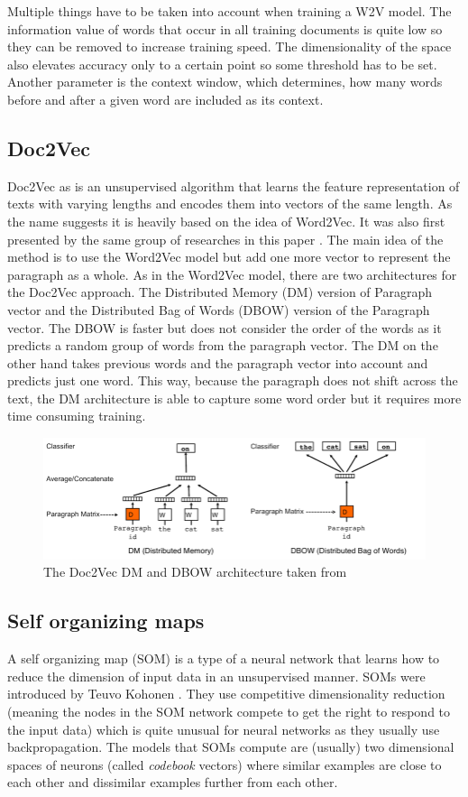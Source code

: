 Multiple things have to be taken into account when training a W2V model. The information value of words that occur in all training documents is quite low so they can be removed to increase training speed. The dimensionality of the space also elevates accuracy only to a certain point so some threshold has to be set. Another parameter is the context window, which determines, how many words before and after a given word are included as its context.

\subsection{Doc2Vec}
Doc2Vec as is an unsupervised algorithm that learns the feature representation of texts with varying lengths and encodes them into vectors of the same length. As the name suggests it is heavily based on the idea of Word2Vec. It was also first presented by the same group of researches in this paper \cite{DBLP:journals/corr/LeM14}. The main idea of the method is to use the Word2Vec model but add one more vector to represent the paragraph as a whole. As in the Word2Vec model, there are two architectures for the Doc2Vec approach. The Distributed Memory (DM) version of Paragraph vector and the Distributed Bag of Words (DBOW) version of the Paragraph vector. The DBOW is faster but does not consider the order of the words as it predicts a random group of words from the paragraph vector. The DM on the other hand takes previous words and the paragraph vector into account and predicts just one word. This way, because the paragraph does not shift across the text, the DM architecture is able to capture some word order but it requires more time consuming training.
\begin{figure}[h]
    \centering
	\includegraphics[width=140mm]{./img/DV_DBOW_doc2vec_architectures.png}
	\caption{The Doc2Vec DM and DBOW architecture taken from \cite{DBLP:journals/corr/LeM14}}
	\label{fig:dbow_dm_d2v_architecture}
\end{figure}
\subsection{Self organizing maps}
A self organizing map (SOM) is a type of a neural network that learns how to reduce the dimension of input data in an unsupervised manner. SOMs were introduced by Teuvo Kohonen \cite{Kohonen1982}. They use competitive dimensionality reduction (meaning the nodes in the SOM network compete to get the right to respond to the input data) which is quite unusual for neural networks as they usually use backpropagation. The models that SOMs compute are (usually) two dimensional spaces of neurons (called \textit{codebook} vectors) where similar examples are close to each other and dissimilar examples further from each other.

